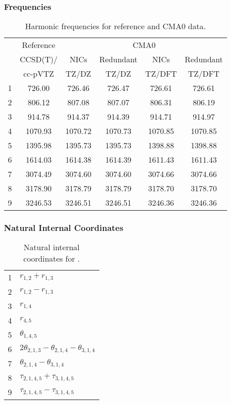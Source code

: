 \documentclass[10pt,oneside]{article}
\begin{document}
\begin{table}[h!]
\subsubsection*{Frequencies}
\centering
\caption{Harmonic frequencies for reference and CMA0 data.}
\begin{tabular}{cccccc}
\toprule
{} & Reference & \multicolumn{4}{c}{CMA0} \\
{} &  CCSD(T)/ &    NICs &  Redundant &    NICs & Redundant \\
{} &   cc-pVTZ &   TZ/DZ &      TZ/DZ &  TZ/DFT &    TZ/DFT \\
\midrule
1 &    726.00 &  726.46 &     726.47 &  726.61 &    726.61 \\
2 &    806.12 &  807.08 &     807.07 &  806.31 &    806.19 \\
3 &    914.78 &  914.37 &     914.39 &  914.71 &    914.97 \\
4 &   1070.93 & 1070.72 &    1070.73 & 1070.85 &   1070.85 \\
5 &   1395.98 & 1395.73 &    1395.73 & 1398.88 &   1398.88 \\
6 &   1614.03 & 1614.38 &    1614.39 & 1611.43 &   1611.43 \\
7 &   3074.49 & 3074.60 &    3074.60 & 3074.66 &   3074.66 \\
8 &   3178.90 & 3178.79 &    3178.79 & 3178.70 &   3178.70 \\
9 &   3246.53 & 3246.51 &    3246.51 & 3246.36 &   3246.36 \\
\bottomrule
\end{tabular}
\end{table}

\begin{table}[h!]
\subsubsection*{Natural Internal Coordinates}
\centering
\caption{Natural internal coordinates for .}
\small
\begin{tabular}{ll}
\toprule
  1   & $r_{1,2} + r_{1,3}$ \\
  2   & $r_{1,2} - r_{1,3}$ \\
  3   & $r_{1,4}$ \\
  4   & $r_{4,5}$ \\
  5   & $\theta_{1,4,5}$ \\
  6   & $2\theta_{2,1,3} - \theta_{2,1,4} - \theta_{3,1,4}$ \\
  7   & $\theta_{2,1,4} - \theta_{3,1,4}$ \\
  8   & $\tau_{2,1,4,5} + \tau_{3,1,4,5}$ \\
  9   & $\tau_{2,1,4,5} - \tau_{3,1,4,5}$ \\
\bottomrule
\end{tabular}
\end{table}
\end{document}
